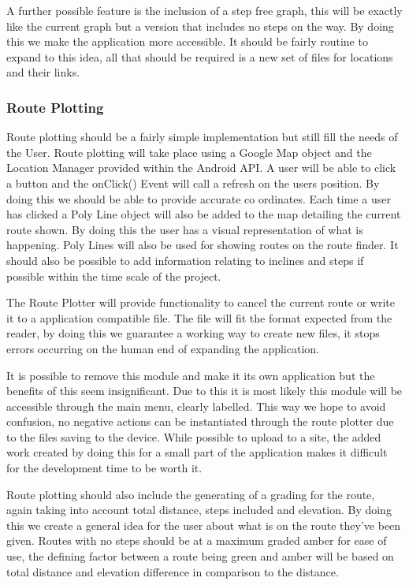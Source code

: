 A further possible feature is the inclusion of a step free graph, this will be exactly like the current graph but a version that includes no steps on the way. By doing this we make the application more accessible. It should be fairly routine to expand to this idea, all that should be required is a new set of files for locations and their links. 
\subsubsection{Route Plotting}
Route plotting should be a fairly simple implementation but still fill the needs of the User. Route plotting will take place using a Google Map object and the Location Manager provided within the Android API\cite{api}. A user will be able to click a button and the onClick() Event will call a refresh on the users position. By doing this we should be able to provide accurate co ordinates. Each time a user has clicked a Poly Line object will also be added to the map detailing the current route shown. By doing this the user has a visual representation of what is happening. Poly Lines will also be used for showing routes on the route finder. It should also be possible to add information relating to inclines and steps if possible within the time scale of the project. 

The Route Plotter will provide functionality to cancel the current route or write it to a application compatible file. The file will fit the format expected from the reader, by doing this we guarantee a working way to create new files, it stops errors occurring on the human end of expanding the application. 

It is possible to remove this module and make it its own application but the benefits of this seem insignificant. Due to this it is most likely this module will be accessible through the main menu, clearly labelled. This way we hope to avoid confusion, no negative actions can be instantiated through the route plotter due to the files saving to the device. While possible to upload to a site, the added work created by doing this for a small part of the application makes it difficult for the development time to be worth it.

Route plotting should also include the generating of a grading for the route, again taking into account  total distance, steps included and elevation. By doing this we create a general idea for the user about what is on the route they've been given. Routes with no steps should be at a maximum graded amber for ease of use, the defining factor between a route being green and amber will be based on total distance and elevation difference in comparison to the distance. 


